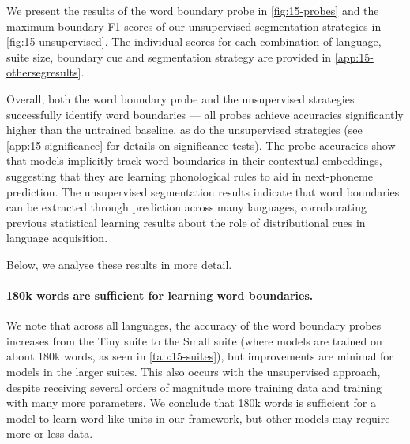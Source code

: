 
We present the results of the word boundary probe in \cref{fig:15-probes} and the maximum boundary F1 scores of our unsupervised segmentation strategies in \cref{fig:15-unsupervised}. The individual scores for each combination of language, suite size, boundary cue and segmentation strategy are provided in \cref{app:15-othersegresults}. %

Overall, both the word boundary probe and the unsupervised strategies successfully identify word boundaries --- all probes achieve accuracies significantly higher than the untrained baseline, as do the unsupervised strategies (see \cref{app:15-significance} for details on significance tests). The probe accuracies show that models implicitly track word boundaries in their contextual embeddings, suggesting that they are learning phonological rules to aid in next-phoneme prediction. The unsupervised segmentation results indicate that word boundaries can be extracted through prediction across many languages, corroborating previous statistical learning results about the role of distributional cues in language acquisition.

Below, we analyse these results in more detail.

\paragraph{180k words are sufficient for learning word boundaries.}
We note that across all languages, the accuracy of the word boundary probes increases from the Tiny suite to the Small suite (where models are trained on about 180k words, as seen in \cref{tab:15-suites}), but improvements are minimal for models in the larger suites. This also occurs with the unsupervised approach, despite receiving several orders of magnitude more training data and training with many more parameters. We conclude that 180k words is sufficient for a model to learn word-like units in our framework, but other models may require more or less data. 

